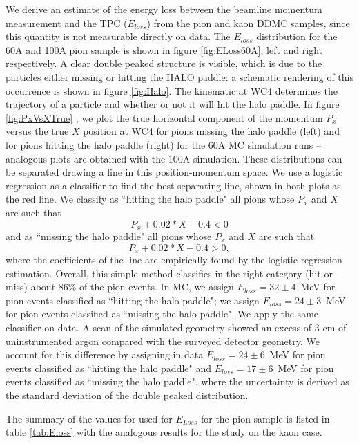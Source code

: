 We derive an estimate of the energy loss between the beamline momentum measurement and the TPC ($E_{loss}$) from the pion and kaon DDMC samples, since this quantity is not  measurable directly on data. 
The $E_{loss}$ distribution for the 60A  and 100A pion sample is shown in figure \ref{fig:ELoss60A}, left and right respectively. A clear double peaked structure is visible, which is due to the particles either missing or hitting the HALO paddle: a schematic rendering of this occurrence is  shown in figure \ref{fig:Halo}. The kinematic at WC4 determines the trajectory of a particle and whether or not it will hit the halo paddle. In figure \ref{fig:PxVsXTrue} , we plot the true  horizontal component of the momentum $P_x$ versus the true $X$ position at WC4 for pions missing the halo paddle (left) and for pions hitting the halo paddle (right) for the 60A MC simulation runs -- analogous plots are obtained with the 100A simulation. These distributions can be separated drawing a line in this position-momentum space. 
We use a logistic regression  \cite{agresti2013categorical}  as a classifier to find the best separating line, shown in both plots as the red line. We classify as ``hitting the halo paddle" all pions whose $P_x$ and $X$ are such that $$P_x +0.02* X - 0.4 < 0 $$ and as ``missing the halo  paddle" all pions whose $P_x$ and $X$ are such that $$P_x +0.02*X - 0.4 > 0, $$ where the coefficients of the line are empirically found by the logistic regression estimation. Overall, this simple method classifies in the right category (hit or miss) about 86\% of the pion events. In MC, we assign  $E_{loss} = 32 \pm 4 $~MeV for pion events classified as ``hitting the halo paddle"; we assign  $E_{loss} = 24 \pm 3 $~MeV for pion events classified as ``missing the halo paddle". We apply the same classifier on data. A scan of the simulated geometry showed an excess of 3 cm of uninstrumented argon compared with the surveyed detector geometry. We account for this difference by assigning in data $E_{loss} = 24 \pm 6 $~MeV for pion events classified as ``hitting the halo paddle" and  $E_{loss} = 17 \pm 6 $~MeV for pion events classified as ``missing the halo paddle", where the uncertainty is derived as the standard deviation of the double peaked distribution.

The summary of the values for used for $E_{Loss}$ for the pion sample is listed in table \ref{tab:Eloss}  with the analogous results for the study on the kaon case.


